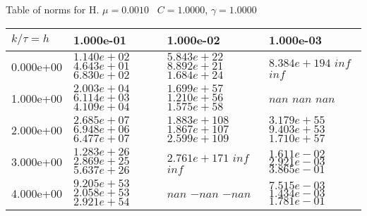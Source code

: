 \begin{center}
Table of norms for H. $\mu = 0.0010$ \, $C = 1.0000$, $\gamma = 1.0000$
  
\begin{tabular}{|p{1in}|p{1in}|p{1in}|p{1in}|} \hline
$k / \tau = h$ &1.000e-01 &1.000e-02 &1.000e-03 \\ \hline 
0.000e+00 & $1.140e+02$  $4.643e+01$  $6.830e+02$  & $5.843e+22$  $8.892e+21$  $1.684e+24$  & $8.384e+194$  $inf$  $inf$  \\ \hline 
1.000e+00 & $2.003e+04$  $6.114e+03$  $4.109e+04$  & $1.699e+57$  $1.210e+56$  $1.575e+58$  & $nan$  $nan$  $nan$  \\ \hline 
2.000e+00 & $2.685e+07$  $6.948e+06$  $6.477e+07$  & $1.883e+108$  $1.867e+107$  $2.599e+109$  & $3.179e+55$  $9.403e+53$  $1.710e+57$  \\ \hline 
3.000e+00 & $1.283e+26$  $2.869e+25$  $5.637e+26$  & $2.761e+171$  $inf$  $inf$  & $1.611e-02$  $2.921e-03$  $3.865e-01$  \\ \hline 
4.000e+00 & $9.205e+53$  $2.058e+53$  $2.921e+54$  & $nan$  $-nan$  $-nan$  & $7.515e-03$  $1.434e-03$  $1.781e-01$  \\ \hline 

\end{tabular}\\[20pt]
\end{center}
